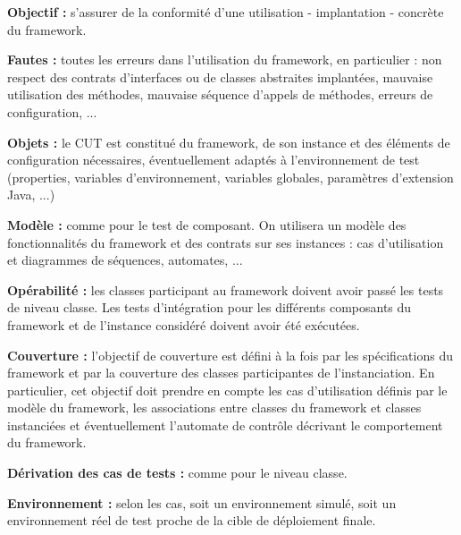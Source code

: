 \textbf{Objectif :}
   s'assurer de la conformit\'e d'une
    utilisation - implantation - concr\`ete du framework.
\par
  
\textbf{Fautes :}
   toutes les erreurs dans l'utilisation du
    framework, en particulier : non respect des contrats d'interfaces
    ou de classes abstraites implant\'ees, mauvaise utilisation des
    m\'ethodes, mauvaise s\'equence d'appels de m\'ethodes, erreurs
    de configuration, ...
\par
  
\textbf{Objets :}
   le CUT est constitu\'e du framework, de son
    instance et des \'el\'ements de configuration n\'ecessaires,
    \'eventuellement adapt\'es \`a l'environnement de test
    (properties, variables d'environnement, variables globales,
    param\`etres d'extension Java, ...) 
\par
  
\textbf{Mod\`ele :}
   comme pour le test de composant. On
    utilisera un mod\`ele des fonctionnalit\'es du framework et des
    contrats sur ses instances : cas d'utilisation et diagrammes de
    s\'equences, automates, ...
\par
  
\textbf{Op\'erabilit\'e : }
   les classes participant au
    framework doivent avoir pass\'e les tests de niveau classe. Les
    tests d'int\'egration pour les diff\'erents composants du
    framework et de l'instance consid\'er\'e doivent avoir \'et\'e
    ex\'ecut\'ees. 
\par
  
\textbf{Couverture :  }
   l'objectif de couverture est d\'efini
    \`a la fois par les sp\'ecifications du framework et par la
    couverture des classes participantes de l'instanciation. En
    particulier, cet objectif doit prendre en compte les cas
    d'utilisation d\'efinis par le mod\`ele du framework, les
    associations entre classes du framework et classes instanci\'ees
    et \'eventuellement l'automate de contr\^ole d\'ecrivant le
    comportement du framework.
\par
  
\textbf{D\'erivation des cas de tests :}
  comme pour le niveau
    classe. 
\par
  
\textbf{Environnement :}
   selon les cas, soit un environnement
    simul\'e, soit un environnement r\'eel de test proche de la
    cible de d\'eploiement finale.
\par
  
